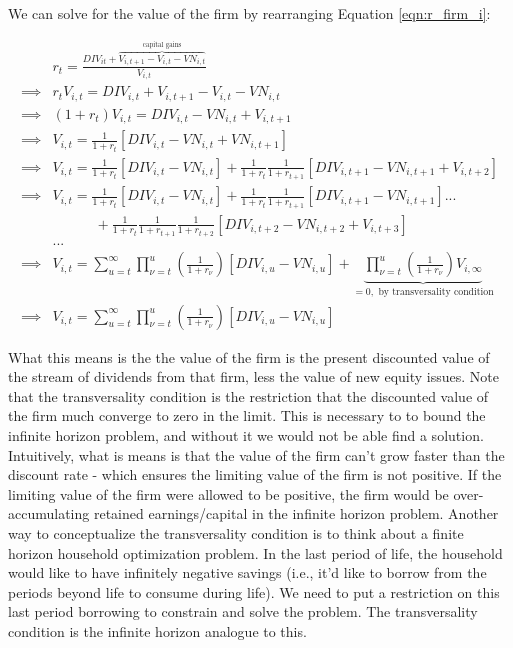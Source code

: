 \documentclass[letterpaper,12pt]{article}
\theoremstyle{definition}
\begin{document}
\begin{spacing}{1.5}
We can solve for the value of the firm by rearranging Equation \ref{eqn:r_firm_i}:

\begin{equation}
\label{eqn:derive_v}
\begin{split}
&r_{t} = \frac{DIV_{it} + \overbrace{V_{i,t+1}-V_{i,t}-VN_{i,t}}^{\text{capital gains}}}{V_{i,t}}\\
\implies & r_{t} V_{i,t} = DIV_{i,t} + V_{i,t+1} - V_{i,t} - VN_{i,t} \\
\implies & (1+r_{t})V_{i,t} = DIV_{i,t} - VN_{i,t} + V_{i,t+1} \\
\implies & V_{i,t} = \frac{1}{1+r_{t}}\left[DIV_{i,t}-VN_{i,t} + VN_{i,t+1}\right] \\
\implies & V_{i,t} = \frac{1}{1+r_{t}}\left[DIV_{i,t}-VN_{i,t}\right]+ \frac{1}{1+r_{t}}\frac{1}{1+r_{t+1}}\left[DIV_{i,t+1}-VN_{i,t+1} + V_{i,t+2}\right] \\
\implies & V_{i,t} =  \frac{1}{1+r_{t}}\left[DIV_{i,t}-VN_{i,t}\right]+ \frac{1}{1+r_{t}}\frac{1}{1+r_{t+1}}\left[DIV_{i,t+1}-VN_{i,t+1}\right] ... \\
 & \quad\quad\quad + \frac{1}{1+r_{t}}\frac{1}{1+r_{t+1}}\frac{1}{1+r_{t+2}}\left[DIV_{i,t+2}-VN_{i,t+2}+ V_{i,t+3}\right] \\
&... \\
\implies & V_{i,t} = \sum_{u=t}^{\infty}\prod_{\nu=t}^{u} \left(\frac{1}{1+r_{\nu}}\right)\left[DIV_{i,u}-VN_{i,u}\right] + \underbrace{\prod_{\nu=t}^{u} \left(\frac{1}{1+r_{\nu}}\right)V_{i,\infty}}_{=0,\text{ by transversality condition}}\\
\implies & V_{i,t} = \sum_{u=t}^{\infty}\prod_{\nu=t}^{u} \left(\frac{1}{1+r_{\nu}}\right)\left[DIV_{i,u}-VN_{i,u}\right] 
\end{split}
\end{equation}

What this means is the the value of the firm is the present discounted value of the stream of dividends from that firm, less the value of new equity issues.  Note that the transversality condition is the restriction that the discounted value of the firm much converge to zero in the limit.  This is necessary to to bound the infinite horizon problem, and without it we would not be able find a solution.  Intuitively, what is means is that the value of the firm can't grow faster than the discount rate - which ensures the limiting value of the firm is not positive.  If the limiting value of the firm were allowed to be positive, the firm would be over-accumulating retained earnings/capital in the infinite horizon problem.  Another way to conceptualize the transversality condition is to think about a finite horizon household optimization problem.  In the last period of life, the household would like to have infinitely negative savings (i.e., it'd like to borrow from the periods beyond life to consume during life).  We need to put a restriction on this last period borrowing to constrain and solve the problem.  The transversality condition is the infinite horizon analogue to this.


\end{spacing}
\end{document}

